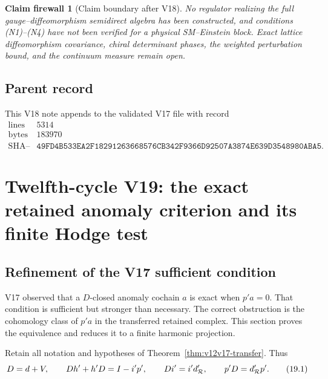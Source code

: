 \documentclass[11pt]{article}
\newtheorem{firewall}[theorem]{Claim firewall}
\theoremstyle{remark}
\begin{document}
\begin{firewall}[Claim boundary after V18]
\label{fire:v12v18-claim}
No regulator realizing the full gauge--diffeomorphism semidirect
algebra has been constructed, and conditions (N1)--(N4) have not been
verified for a physical SM--Einstein block.  Exact lattice
diffeomorphism covariance, chiral determinant phases, the weighted
perturbation bound, and the continuum measure remain open.
\end{firewall}

\subsection{Parent record}

This V18 note appends to the validated V17 file with record
\[
\begin{array}{c|c}
\text{lines}&5314\\
\text{bytes}&183970\\
\text{SHA--256}&
\texttt{49FD4B533EA2F18291263668576CB342F9366D92507A3874E639D3548980ABA5}.
\end{array}
\]


\section{Twelfth-cycle V19: the exact retained anomaly criterion and
its finite Hodge test}
\label{sec:v12v19}

\subsection{Refinement of the V17 sufficient condition}

V17 observed that a \(D\)-closed anomaly cochain \(a\) is exact when
\(p'a=0\).  That condition is sufficient but stronger than necessary.
The correct obstruction is the cohomology class of \(p'a\) in the
transferred retained complex.  This section proves the equivalence
and reduces it to a finite harmonic projection.

Retain all notation and hypotheses of
Theorem~\ref{thm:v12v17-transfer}.  Thus
\[
 D=d+V,\qquad
 D h'+h'D=I-i'p',\qquad
 Di'=i'd_{\cal R}',\qquad
 p'D=d_{\cal R}'p'.                                       \tag{19.1}
\]
\end{document}
